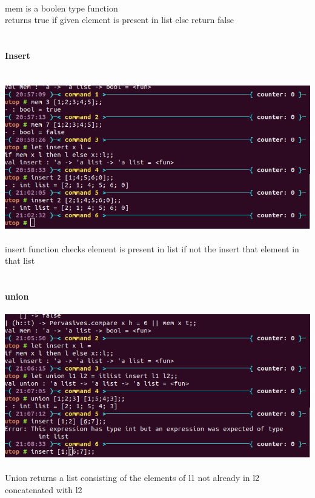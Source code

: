 \documentclass{article}
\begin{document}
\\
mem is a boolen type function\\
returns true if given element is present in list else return false\\
\\
\\
\textbf{Insert}\\
\\
\\
\includegraphics{images/image12.png}
\\
\\
insert function checks element is present in list if not the insert that element in that list\\
\\
\\
\textbf{union}\\
\\
\includegraphics{images/image6.png}
\\
\\
Union returns a list consisting of the elements of l1 not already in l2 concatenated with l2\\
\end{document}
